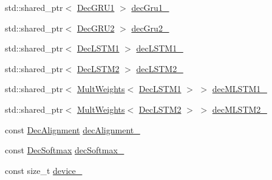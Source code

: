 \begin{DoxyCompactItemize}
\item 
std\+::shared\+\_\+ptr$<$ \hyperlink{structamunmt_1_1GPU_1_1Weights_1_1DecGRU1}{Dec\+G\+R\+U1} $>$ \hyperlink{structamunmt_1_1GPU_1_1Weights_ac3c477a5126a38078a9f824cce574ae2}{dec\+Gru1\+\_\+}
\item 
std\+::shared\+\_\+ptr$<$ \hyperlink{structamunmt_1_1GPU_1_1Weights_1_1DecGRU2}{Dec\+G\+R\+U2} $>$ \hyperlink{structamunmt_1_1GPU_1_1Weights_a6f333b8ce7efa26bdb44acf4902b651e}{dec\+Gru2\+\_\+}
\item 
std\+::shared\+\_\+ptr$<$ \hyperlink{structamunmt_1_1GPU_1_1Weights_1_1DecLSTM1}{Dec\+L\+S\+T\+M1} $>$ \hyperlink{structamunmt_1_1GPU_1_1Weights_a9d6a84a46778f44da098e09deabd1434}{dec\+L\+S\+T\+M1\+\_\+}
\item 
std\+::shared\+\_\+ptr$<$ \hyperlink{structamunmt_1_1GPU_1_1Weights_1_1DecLSTM2}{Dec\+L\+S\+T\+M2} $>$ \hyperlink{structamunmt_1_1GPU_1_1Weights_a680cf6d59125ef2b8eeac1fd29679984}{dec\+L\+S\+T\+M2\+\_\+}
\item 
std\+::shared\+\_\+ptr$<$ \hyperlink{structamunmt_1_1GPU_1_1Weights_1_1MultWeights}{Mult\+Weights}$<$ \hyperlink{structamunmt_1_1GPU_1_1Weights_1_1DecLSTM1}{Dec\+L\+S\+T\+M1} $>$ $>$ \hyperlink{structamunmt_1_1GPU_1_1Weights_a267b4f3b1fbc7c224a4a3fa9aa126658}{dec\+M\+L\+S\+T\+M1\+\_\+}
\item 
std\+::shared\+\_\+ptr$<$ \hyperlink{structamunmt_1_1GPU_1_1Weights_1_1MultWeights}{Mult\+Weights}$<$ \hyperlink{structamunmt_1_1GPU_1_1Weights_1_1DecLSTM2}{Dec\+L\+S\+T\+M2} $>$ $>$ \hyperlink{structamunmt_1_1GPU_1_1Weights_ac2efb526e19d690a736aca4f952703f2}{dec\+M\+L\+S\+T\+M2\+\_\+}
\item 
const \hyperlink{structamunmt_1_1GPU_1_1Weights_1_1DecAlignment}{Dec\+Alignment} \hyperlink{structamunmt_1_1GPU_1_1Weights_ae42172415ad97ecd7f25f4038ee1e7ec}{dec\+Alignment\+\_\+}
\item 
const \hyperlink{structamunmt_1_1GPU_1_1Weights_1_1DecSoftmax}{Dec\+Softmax} \hyperlink{structamunmt_1_1GPU_1_1Weights_aaebd4d22c9dcebd7e000ecad3b154c38}{dec\+Softmax\+\_\+}
\item 
const size\+\_\+t \hyperlink{structamunmt_1_1GPU_1_1Weights_ac3a0d691e36aafe2377ccbd9270aa642}{device\+\_\+}
\end{DoxyCompactItemize}
